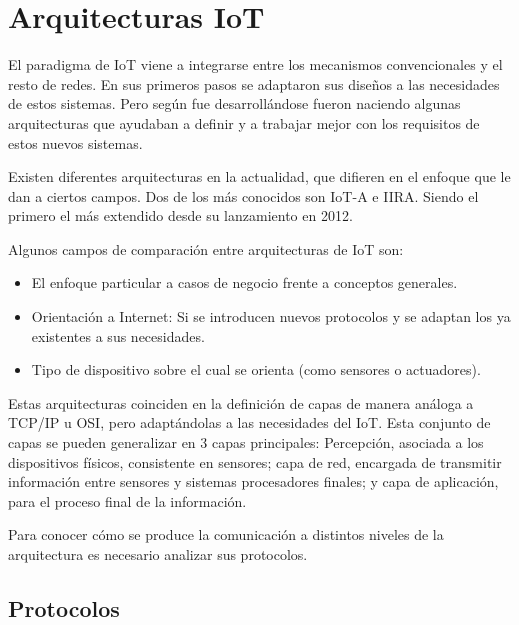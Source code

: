 \documentclass[a4paper,10pt]{article}
\begin{document}
\newpage

\section{Arquitecturas IoT}\label{arquitecturas-iot}

El paradigma de IoT viene a integrarse entre los mecanismos
convencionales y el resto de redes. En sus primeros pasos se adaptaron
sus diseños a las necesidades de estos sistemas. Pero según fue
desarrollándose fueron naciendo algunas arquitecturas que ayudaban a
definir y a trabajar mejor con los requisitos de estos nuevos sistemas.

Existen diferentes arquitecturas en la actualidad, que difieren en el
enfoque que le dan a ciertos campos. Dos de los más conocidos son IoT-A
e IIRA. Siendo el primero el más extendido desde su lanzamiento en 2012\cite{weyrichReferenceArchitecturesInternet2016}.

Algunos campos de comparación entre arquitecturas de IoT son\cite{atzoriInternetThingsSurvey2010}:

\begin{itemize}
\item
  El enfoque particular a casos de negocio frente a conceptos generales.
\item
  Orientación a Internet: Si se introducen nuevos protocolos y se
  adaptan los ya existentes a sus necesidades.
\item
  Tipo de dispositivo sobre el cual se orienta (como sensores o
  actuadores).
\end{itemize}

Estas arquitecturas coinciden en la definición de capas de manera
análoga a TCP/IP u
OSI\cite{weyrichReferenceArchitecturesInternet2016}, pero adaptándolas
a las necesidades del IoT. Esta conjunto de capas se pueden
generalizar en 3 capas principales: Percepción, asociada a los
dispositivos físicos, consistente en sensores; capa de red, encargada
de transmitir información entre sensores y sistemas procesadores
finales; y capa de aplicación, para el proceso final de la
información\cite{khanFutureInternetInternet2012}.

Para conocer cómo se produce la comunicación a distintos niveles de la
arquitectura es necesario analizar sus protocolos.

\subsection{Protocolos}\label{subsec:protocolos}
\end{document}
